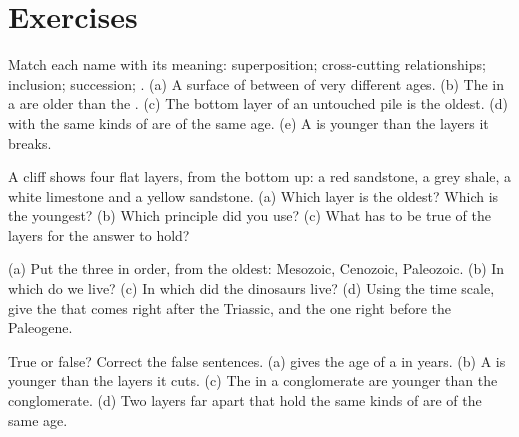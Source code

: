 \section{Exercises}

\begin{exercise}[$\star$]\label{exo:g7:geological-time:1}
Match each name with its meaning: superposition; cross-cutting
relationships; inclusion;  succession; . (a) A surface
of  between  of very different ages. (b) The  in a
 are older than the . (c) The bottom layer of an untouched pile
is the oldest. (d)  with the same kinds of  are of the same
age. (e) A  is younger than the layers it breaks.
\end{exercise}

\begin{exercise}[$\star$]\label{exo:g7:geological-time:2}
A cliff shows four flat layers, from the bottom up: a red sandstone, a
grey shale, a white limestone and a yellow sandstone. (a) Which layer
is the oldest? Which is the youngest? (b) Which principle did you use?
(c) What has to be true of the layers for the answer to hold?
\end{exercise}

\begin{exercise}[$\star$]\label{exo:g7:geological-time:3}
(a) Put the three  in order, from the oldest: Mesozoic, Cenozoic,
Paleozoic. (b) In which  do we live? (c) In which  did the
dinosaurs live? (d) Using the time scale, give the 
that comes right after the Triassic, and the one right before the
Paleogene.
\end{exercise}

\begin{exercise}[$\star$]\label{exo:g7:geological-time:4}
True or false? Correct the false sentences. (a)  gives
the age of a  in years. (b) A  is younger than the layers it
cuts. (c) The  in a conglomerate are younger than the
conglomerate. (d) Two layers far apart that hold the same kinds of
 are of the same age.
\end{exercise}

